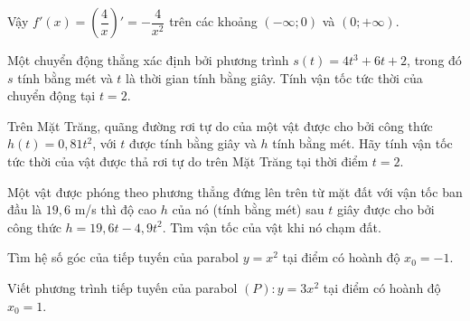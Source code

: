 \begin{bt}
\begin{bt}
{\begin{enumerate}
	Vậy $f'(x)=\left(\dfrac{4}{x}\right)'=-\dfrac{4}{x^2}$ trên các khoảng $(-\infty ; 0)$ và $(0 ;+\infty)$.
	\end{enumerate}}
\end{bt}
\begin{bt}%
	Một chuyển động thẳng xác định bởi phương trình $s(t)=4 t^3+6 t+2$, trong đó $s$ tính bằng mét và $t$ là thời gian tính bằng giây. Tính vận tốc tức thời của chuyển động tại $t=2$.
\end{bt}
\begin{bt}%
	Trên Mặt Trăng, quãng đường rơi tự do của một vật được cho bởi công thức $h(t)=0,81 t^2$, với $t$ được tính bằng giây và $h$ tính bằng mét. Hãy tính vận tốc tức thời của vật được thả rơi tự do trên Mặt Trăng tại thời điểm $t=2$.
\end{bt}
\begin{bt}%
	Một vật được phóng theo phương thẳng đứng lên trên từ mặt đất với vận tốc ban đầu là $19{,}6$ m/s thì độ cao $h$ của nó (tính bằng mét) sau $t$ giây được cho bởi công thức $h=19{,}6t-4{,}9t^2$. Tìm vận tốc của vật khi nó chạm đất.
\end{bt}
\begin{bt}%
	Tìm hệ số góc của tiếp tuyến của parabol $y=x^2$ tại điểm có hoành độ $x_0=-1$.
\end{bt}
\begin{bt}%
	Viết phương trình tiếp tuyến của parabol $(P)\colon y=3x^2$ tại điểm có hoành độ $x_0=1$.
\end{bt}
\end{bt}
